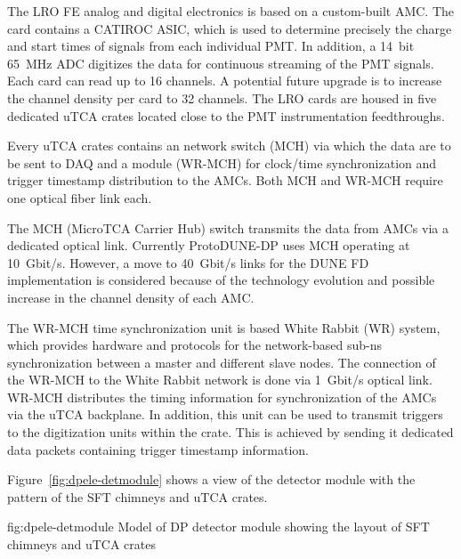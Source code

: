 The LRO FE analog and digital electronics is based on a custom-built AMC. The card contains a CATIROC ASIC, which is used to determine precisely the charge and start times of signals from each individual PMT. In addition, a \SI{14}{bit} \SI{65}{MHz} ADC digitizes the data for continuous streaming of the PMT signals. Each card can read up to \num{16} channels. A potential future upgrade is to increase the channel density per card to \num{32} channels. The LRO cards are housed in five dedicated uTCA crates located close to the PMT instrumentation feedthroughs.

Every uTCA crates contains an network switch (MCH) via which the data are to be sent to DAQ and a module (WR-MCH) for clock/time synchronization and trigger timestamp distribution to the AMCs. Both MCH and WR-MCH require one optical fiber link each. 

The MCH (MicroTCA Carrier Hub) switch transmits the data from AMCs via a dedicated optical link. Currently ProtoDUNE-DP uses MCH operating at \SI{10}{Gbit/s}. However, a move to \SI{40}{Gbit/s} links for the DUNE FD implementation is considered because of the technology evolution and possible increase in the channel density of each AMC.

The WR-MCH time synchronization unit is based White Rabbit (WR) system, which provides hardware and protocols for the network-based sub-ns synchronization between a master and different slave nodes. The connection of the WR-MCH to the White Rabbit network is done via \SI{1}{Gbit/s} optical link. WR-MCH distributes the timing information for synchronization of the AMCs via the uTCA backplane. In addition, this unit can be used to transmit triggers to the digitization units within the crate. This is achieved by sending it dedicated data packets containing trigger timestamp information. 

Figure~\ref{fig:dpele-detmodule} shows a view of the detector module with the pattern of the SFT chimneys and uTCA crates. 

\begin{dunefigure}{fig:dpele-detmodule}
{Model of DP detector module showing the layout of SFT chimneys and uTCA crates}
\end{dunefigure}


